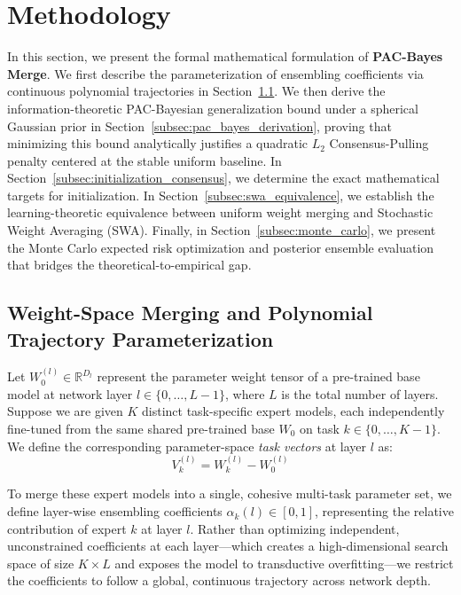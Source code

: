 \section{Methodology}
\label{sec:method}

In this section, we present the formal mathematical formulation of \textbf{PAC-Bayes Merge}. We first describe the parameterization of ensembling coefficients via continuous polynomial trajectories in Section~\ref{subsec:poly_trajectory}. We then derive the information-theoretic PAC-Bayesian generalization bound under a spherical Gaussian prior in Section~\ref{subsec:pac_bayes_derivation}, proving that minimizing this bound analytically justifies a quadratic $L_2$ Consensus-Pulling penalty centered at the stable uniform baseline. In Section~\ref{subsec:initialization_consensus}, we determine the exact mathematical targets for initialization. In Section~\ref{subsec:swa_equivalence}, we establish the learning-theoretic equivalence between uniform weight merging and Stochastic Weight Averaging (SWA). Finally, in Section~\ref{subsec:monte_carlo}, we present the Monte Carlo expected risk optimization and posterior ensemble evaluation that bridges the theoretical-to-empirical gap.

\subsection{Weight-Space Merging and Polynomial Trajectory Parameterization}
\label{subsec:poly_trajectory}
Let $W_0^{(l)} \in \mathbb{R}^{D_l}$ represent the parameter weight tensor of a pre-trained base model at network layer $l \in \{0, \dots, L-1\}$, where $L$ is the total number of layers. Suppose we are given $K$ distinct task-specific expert models, each independently fine-tuned from the same shared pre-trained base $W_0$ on task $k \in \{0, \dots, K-1\}$. We define the corresponding parameter-space \emph{task vectors} at layer $l$ as:
\begin{equation}
V_k^{(l)} = W_k^{(l)} - W_0^{(l)}
\end{equation}

To merge these expert models into a single, cohesive multi-task parameter set, we define layer-wise ensembling coefficients $\alpha_k(l) \in [0, 1]$, representing the relative contribution of expert $k$ at layer $l$. Rather than optimizing independent, unconstrained coefficients at each layer---which creates a high-dimensional search space of size $K \times L$ and exposes the model to transductive overfitting---we restrict the coefficients to follow a global, continuous trajectory across network depth. 

